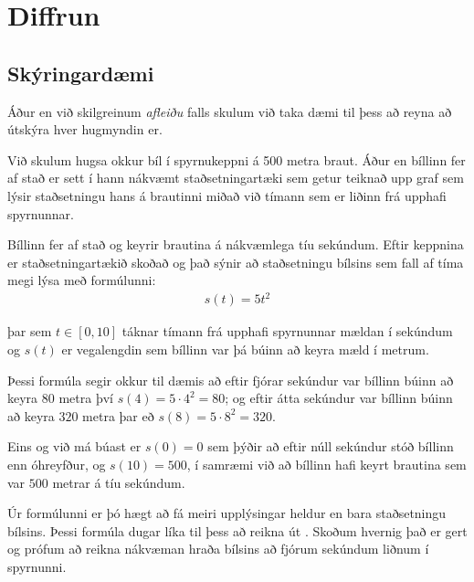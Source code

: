 \documentclass[a4paper,10pt,icelandic]{sphinxmanual}
\begin{document}
\chapter{Diffrun}
\label{\detokenize{Kafli11:diffrun}}\label{\detokenize{Kafli11::doc}}

\section{Skýringardæmi}
\label{\detokenize{Kafli11:skyringardaemi}}
Áður en við skilgreinum \textit{afleiðu} falls skulum við taka dæmi til þess að reyna að útskýra hver hugmyndin er.

Við skulum hugsa okkur bíl í spyrnukeppni á 500 metra braut.
Áður en bíllinn fer af stað er sett í hann nákvæmt staðsetningartæki sem getur teiknað upp graf sem lýsir staðsetningu hans á brautinni miðað við tímann sem er liðinn frá upphafi spyrnunnar.

Bíllinn fer af stað og keyrir brautina á nákvæmlega tíu sekúndum.
Eftir keppnina er staðsetningartækið skoðað og það sýnir að staðsetningu bílsins sem fall af tíma megi lýsa með formúlunni:
\begin{equation*}
\begin{split}s(t) = 5t^2\end{split}
\end{equation*}

þar sem \(t \in [0, 10]\) táknar tímann frá upphafi spyrnunnar mældan í sekúndum og \(s(t)\) er vegalengdin sem bíllinn var þá búinn að keyra mæld í metrum.

Þessi formúla segir okkur til dæmis að eftir fjórar sekúndur var bíllinn búinn að keyra 80 metra því \(s(4) = 5 \cdot 4^2 = 80\); og eftir átta sekúndur var bíllinn búinn að keyra \(320\) metra þar eð \(s(8) = 5\cdot 8^2 =320\).

Eins og við má búast er \(s(0) = 0\) sem þýðir að eftir núll sekúndur stóð bíllinn enn óhreyfður, og \(s(10) = 500\), í samræmi við að bíllinn hafi keyrt brautina sem var \(500\) metrar á tíu sekúndum.

Úr formúlunni er þó hægt að fá meiri upplýsingar heldur en bara staðsetningu bílsins.
Þessi formúla dugar líka til þess að reikna út .
Skoðum hvernig það er gert og prófum að reikna nákvæman hraða bílsins að fjórum sekúndum liðnum í spyrnunni.
\end{document}
